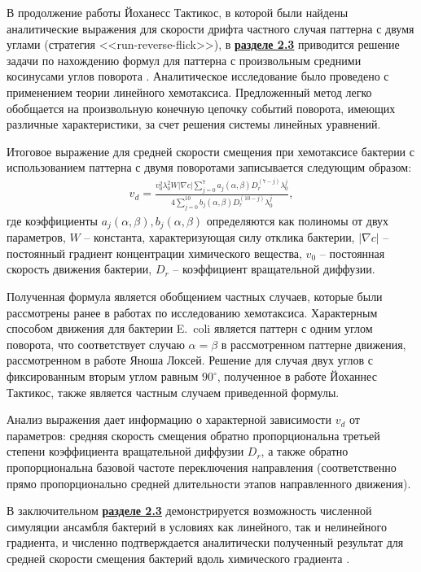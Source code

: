 В продолжение работы Йоханесс Тактикос, в которой были найдены аналитические выражения для скорости дрифта частного случая паттерна с двумя углами (стратегия <<run-reverse-flick>>), в \underline{\textbf{разделе 2.3}} приводится решение задачи по нахождению формул для паттерна с произвольным средними косинусами углов поворота \cite{bib2}. Аналитическое исследование было проведено с применением теории линейного хемотаксиса. Предложенный метод легко обобщается на произвольную конечную цепочку событий поворота, имеющих различные характеристики, за счет решения системы линейных уравнений.

Итоговое выражение для средней скорости смещения при хемотаксисе бактерии с использованием паттерна с двумя поворотами записывается следующим образом:
\begin{equation}
    \begin{aligned}
        v_d=\frac{v_0^2\lambda_0^2W|\nabla c|\sum_{j=0}^{7} a_j(\alpha, \beta)D_r^(7-j)\lambda_0^j}{4\sum_{j=0}^{10}b_j(\alpha,\beta)D_r^(10-j)\lambda_0^j},
        \label{eq:drift-speed-solution}
    \end{aligned}
\end{equation}
где коэффициенты $a_j(\alpha,\beta), b_j(\alpha,\beta)$ определяются как полиномы от двух параметров, $W$ -- константа, характеризующая силу отклика бактерии, $|\nabla c|$ -- постоянный градиент концентрации химического вещества, $v_0$ -- постоянная скорость движения бактерии, $D_r$ -- коэффициент вращательной диффузии.

Полученная формула является обобщением частных случаев, которые были рассмотрены ранее в работах по исследованию хемотаксиса. Характерным способом движения для бактерии E.~coli является паттерн с одним углом поворота, что соответствует случаю $\alpha=\beta$ в рассмотренном паттерне движения, рассмотренном в работе Яноша Локсей. Решение для случая двух углов с фиксированным вторым углом равным $90^\circ$, полученное в работе Йоханнес Тактикос, также является частным случаем приведенной формулы.

Анализ выражения дает информацию о характерной зависимости $v_d$ от параметров: средняя скорость смещения обратно пропорциональна третьей степени коэффициента вращательной диффузии $D_r$, а также обратно пропорциональна базовой частоте переключения направления (соответственно прямо пропорционально средней длительности этапов направленного движения). 

В заключительном \underline{\textbf{разделе 2.3}} демонстрируется возможность численной симуляции ансамбля бактерий в условиях как линейного, так и нелинейного градиента, и численно подтверждается аналитически полученный результат для средней скорости смещения бактерий вдоль химического градиента \cite{confbib6}.



